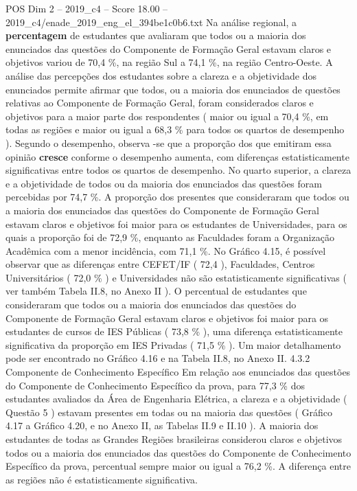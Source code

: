 \begin{textsample}{POS Dim 2 – 2019\_c4 – Score 18.00 – 2019\_c4/enade\_2019\_eng\_el\_394be1c0b6.txt}
Na análise regional, a \textbf{percentagem} de estudantes que avaliaram que todos ou a maioria dos enunciados das questões do Componente de Formação Geral estavam claros e objetivos variou de 70,4 \%, na região Sul a 74,1 \%, na região Centro-Oeste.
A análise das percepções dos estudantes sobre a clareza e a objetividade dos enunciados permite afirmar que todos, ou a maioria dos enunciados de questões relativas ao Componente de Formação Geral, foram considerados claros e objetivos para a maior parte dos respondentes ( maior ou igual a 70,4 \%, em todas as regiões e maior ou igual a 68,3 \% para todos os quartos de desempenho ).
Segundo o desempenho, observa -se que a proporção dos que emitiram essa opinião \textbf{cresce} conforme o desempenho aumenta, com diferenças estatisticamente significativas entre todos os quartos de desempenho.
No quarto superior, a clareza e a objetividade de todos ou da maioria dos enunciados das questões foram percebidas por 74,7 \%.
A proporção dos presentes que consideraram que todos ou a maioria dos enunciados das questões do Componente de Formação Geral estavam claros e objetivos foi maior para os estudantes de Universidades, para os quais a proporção foi de 72,9 \%, enquanto as Faculdades foram a Organização Acadêmica com a menor incidência, com 71,1 \%.
No Gráfico 4.15, é possível observar que as diferenças entre CEFET/IF ( 72,4 ), Faculdades, Centros Universitários ( 72,0 \% ) e Universidades não são estatisticamente significativas ( ver também Tabela II.8, no Anexo II ).
O percentual de estudantes que consideraram que todos ou a maioria dos enunciados das questões do Componente de Formação Geral estavam claros e objetivos foi maior para os estudantes de cursos de IES Públicas ( 73,8 \% ), uma diferença estatisticamente significativa da proporção em IES Privadas ( 71,5 \% ).
Um maior detalhamento pode ser encontrado no Gráfico 4.16 e na Tabela II.8, no Anexo II. 4.3.2 Componente de Conhecimento Específico Em relação aos enunciados das questões do Componente de Conhecimento Específico da prova, para 77,3 \% dos estudantes avaliados da Área de Engenharia Elétrica, a clareza e a objetividade ( Questão 5 ) estavam presentes em todas ou na maioria das questões ( Gráfico 4.17 a Gráfico 4.20, e no Anexo II, as Tabelas II.9 e II.10 ).
A maioria dos estudantes de todas as Grandes Regiões brasileiras considerou claros e objetivos todos ou a maioria dos enunciados das questões do Componente de Conhecimento Específico da prova, percentual sempre maior ou igual a 76,2 \%.
A diferença entre as regiões não é estatisticamente significativa.

\end{textsample}
